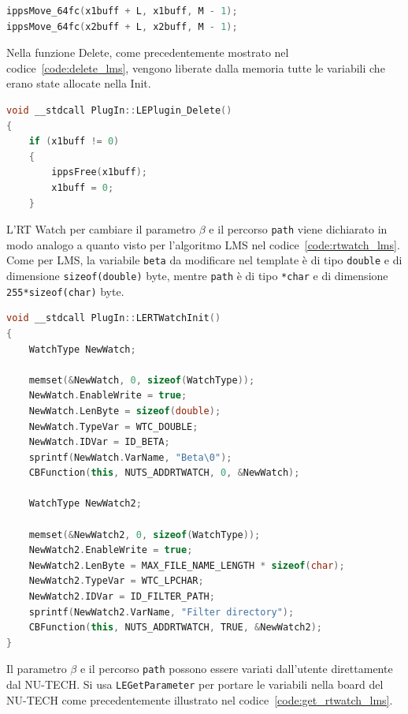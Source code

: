 \documentclass[12pt,a4paper,titlepage]{article}
\begin{document}
\begin{lstlisting}[language=cpp, label=code:aggiornamento_buffer_ingresso, caption = Aggiornamento dei buffer di ingresso, breaklines = false, captionpos = b]
ippsMove_64fc(x1buff + L, x1buff, M - 1);
ippsMove_64fc(x2buff + L, x2buff, M - 1);
\end{lstlisting}
Nella funzione Delete, come precedentemente mostrato nel codice~\ref{code:delete_lms}, vengono liberate dalla memoria tutte le variabili che erano state allocate nella Init.
\begin{lstlisting}[language=cpp, label=code:delete_fd, caption = Funzione \texttt{LEPlugin\_Delete}, breaklines = false, captionpos = b]
void __stdcall PlugIn::LEPlugin_Delete()
{
	if (x1buff != 0)
	{
		ippsFree(x1buff);
		x1buff = 0;
	}
\end{lstlisting}

L'RT Watch per cambiare il parametro $\beta$ e il percorso \texttt{path} viene dichiarato in modo analogo a quanto visto per l'algoritmo LMS nel codice~\ref{code:rtwatch_lms}. Come per LMS, la variabile \texttt{beta} da modificare nel template è di tipo \texttt{double} e di dimensione \texttt{sizeof(double)} byte, mentre \texttt{path} è di tipo \texttt{*char} e di dimensione \texttt{255*sizeof(char)} byte.

\begin{lstlisting}[language=cpp, label=code:rtwatch_fd, caption = Creazione RT Watch, breaklines = false, captionpos = b]
void __stdcall PlugIn::LERTWatchInit()
{
	WatchType NewWatch;

	memset(&NewWatch, 0, sizeof(WatchType));
	NewWatch.EnableWrite = true;
	NewWatch.LenByte = sizeof(double);
	NewWatch.TypeVar = WTC_DOUBLE;
	NewWatch.IDVar = ID_BETA;
	sprintf(NewWatch.VarName, "Beta\0");
	CBFunction(this, NUTS_ADDRTWATCH, 0, &NewWatch);
	
	WatchType NewWatch2;

	memset(&NewWatch2, 0, sizeof(WatchType));
	NewWatch2.EnableWrite = true;
	NewWatch2.LenByte = MAX_FILE_NAME_LENGTH * sizeof(char);
	NewWatch2.TypeVar = WTC_LPCHAR;
	NewWatch2.IDVar = ID_FILTER_PATH;
	sprintf(NewWatch2.VarName, "Filter directory");
	CBFunction(this, NUTS_ADDRTWATCH, TRUE, &NewWatch2);
}
\end{lstlisting}
Il parametro $\beta$ e il percorso \texttt{path} possono essere variati dall'utente direttamente dal NU-TECH. Si usa \texttt{LEGetParameter} per portare le variabili nella board del NU-TECH come precedentemente illustrato nel codice~\ref{code:get_rtwatch_lms}.
\end{document}
